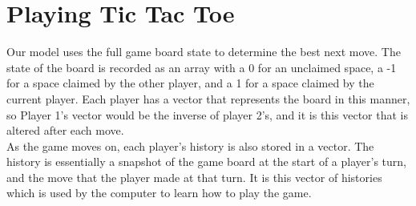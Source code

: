\documentclass{article}
\begin{document}
\section*{Playing Tic Tac Toe}
Our model uses the full game board state to determine the best next move. The state of the board is recorded as an array with a 0 for an unclaimed space, a -1 for a space claimed by the other player, and a 1 for a space claimed by the current player. Each player has a vector that represents the board in this manner, so Player 1's vector would be the inverse of player 2's, and it is this vector that is altered after each move. \\
As the game moves on, each player's history is also stored in a vector. The history is essentially a snapshot of the game board at the start of a player's turn, and the move that the player made at that turn. It is this vector of histories which is used by the computer to learn how to play the game.
 
\end{document}
